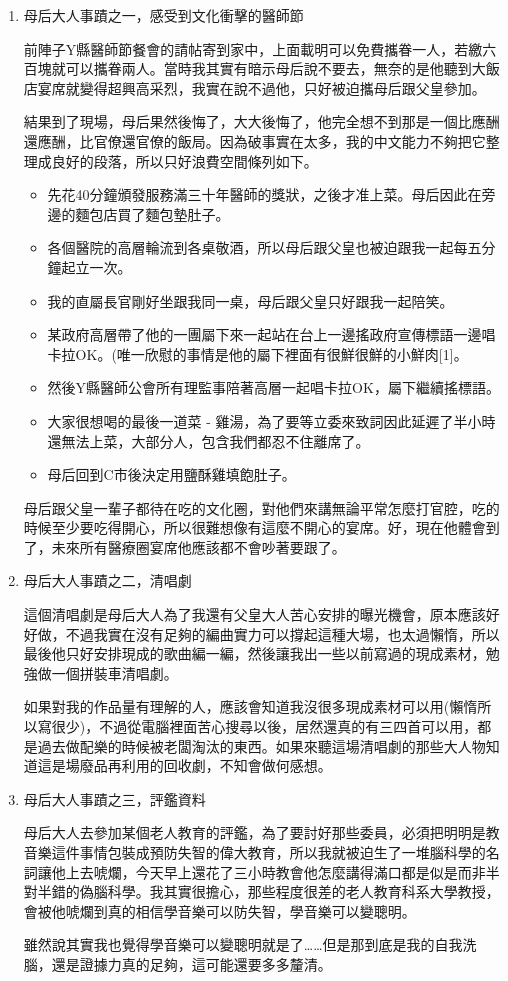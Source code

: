 \documentclass[
]{article}
\begin{document}
\begin{enumerate}
\def\labelenumi{\arabic{enumi}.}
\item
  母后大人事蹟之一，感受到文化衝擊的醫師節

  前陣子Y縣醫師節餐會的請帖寄到家中，上面載明可以免費攜眷一人，若繳六百塊就可以攜眷兩人。當時我其實有暗示母后說不要去，無奈的是他聽到大飯店宴席就變得超興高采烈，我實在說不過他，只好被迫攜母后跟父皇參加。

  結果到了現場，母后果然後悔了，大大後悔了，他完全想不到那是一個比應酬還應酬，比官僚還官僚的飯局。因為破事實在太多，我的中文能力不夠把它整理成良好的段落，所以只好浪費空間條列如下。

  \begin{itemize}
  \item
    先花40分鐘頒發服務滿三十年醫師的獎狀，之後才准上菜。母后因此在旁邊的麵包店買了麵包墊肚子。
  \item
    各個醫院的高層輪流到各桌敬酒，所以母后跟父皇也被迫跟我一起每五分鐘起立一次。
  \item
    我的直屬長官剛好坐跟我同一桌，母后跟父皇只好跟我一起陪笑。
  \item
    某政府高層帶了他的一團屬下來一起站在台上一邊搖政府宣傳標語一邊唱卡拉OK。(唯一欣慰的事情是他的屬下裡面有很鮮很鮮的小鮮肉{[}1{]}。
  \item
    然後Y縣醫師公會所有理監事陪著高層一起唱卡拉OK，屬下繼續搖標語。
  \item
    大家很想喝的最後一道菜 -
    雞湯，為了要等立委來致詞因此延遲了半小時還無法上菜，大部分人，包含我們都忍不住離席了。
  \item
    母后回到C市後決定用鹽酥雞填飽肚子。
  \end{itemize}

  母后跟父皇一輩子都待在吃的文化圈，對他們來講無論平常怎麼打官腔，吃的時候至少要吃得開心，所以很難想像有這麼不開心的宴席。好，現在他體會到了，未來所有醫療圈宴席他應該都不會吵著要跟了。
\item
  母后大人事蹟之二，清唱劇

  這個清唱劇是母后大人為了我還有父皇大人苦心安排的曝光機會，原本應該好好做，不過我實在沒有足夠的編曲實力可以撐起這種大場，也太過懶惰，所以最後他只好安排現成的歌曲編一編，然後讓我出一些以前寫過的現成素材，勉強做一個拼裝車清唱劇。

  如果對我的作品量有理解的人，應該會知道我沒很多現成素材可以用(懶惰所以寫很少)，不過從電腦裡面苦心搜尋以後，居然還真的有三四首可以用，都是過去做配樂的時候被老闆淘汰的東西。如果來聽這場清唱劇的那些大人物知道這是場廢品再利用的回收劇，不知會做何感想。
\item
  母后大人事蹟之三，評鑑資料

  母后大人去參加某個老人教育的評鑑，為了要討好那些委員，必須把明明是教音樂這件事情包裝成預防失智的偉大教育，所以我就被迫生了一堆腦科學的名詞讓他上去唬爛，今天早上還花了三小時教會他怎麼講得滿口都是似是而非半對半錯的偽腦科學。我其實很擔心，那些程度很差的老人教育科系大學教授，會被他唬爛到真的相信學音樂可以防失智，學音樂可以變聰明。

  雖然說其實我也覺得學音樂可以變聰明就是了\ldots\ldots 但是那到底是我的自我洗腦，還是證據力真的足夠，這可能還要多多釐清。
\end{enumerate}
\end{document}
